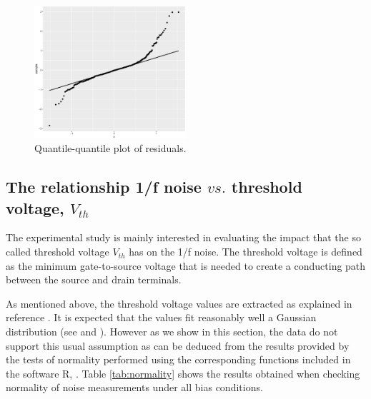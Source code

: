 \documentclass[sn-mathphys]{sn-jnl}%
\theoremstyle{thmstyleone}%
\theoremstyle{thmstyletwo}%
\theoremstyle{thmstylethree}%
\begin{document}
\begin{figure}[ht]
	\centerline{
		\includegraphics[width=0.5\textwidth]{Fig5_residuos.eps}}
	\caption{Quantile-quantile plot of residuals.}
	\label{fig:normalidad}
\end{figure}

\subsection{The relationship 1/f noise $vs.$ threshold voltage, $V_{th}$} \label{sec:noiseVSvth}
The experimental study is mainly interested in evaluating the impact that the so called threshold voltage $V_{th}$ has on the 1/f noise. The threshold voltage is defined as the minimum gate-to-source voltage that is needed to create a conducting path between the source and drain terminals.\

As mentioned above, the threshold voltage values are extracted as explained in reference \cite{Duty2016}. It is expected that the values fit reasonably well a Gaussian distribution (see \cite{Duty2016} and \cite{Schroder2006}). However as we show in this section, the data do not support this usual assumption as can be deduced from the results provided by the tests of normality performed using the corresponding functions included in the software R, \cite{R2021}. Table \ref{tab:normality} shows the results obtained when checking normality of noise measurements under all bias conditions.
\end{document}
